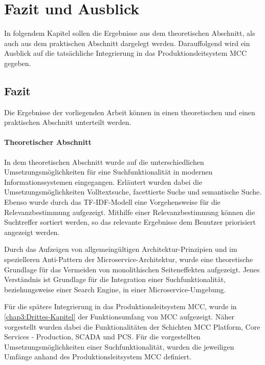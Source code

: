 \chapter{Fazit und Ausblick\label{chap6:Sechstes-Kapitel}}

In folgendem Kapitel sollen die Ergebnisse aus dem theoretischen Abschnitt, als auch aus dem praktischen Abschnitt dargelegt werden. Darauffolgend wird ein Ausblick auf die tatsächliche Integrierung in das Produktionsleitsystem MCC gegeben.

\section{Fazit\label{sec6.1:Unterpunkt-1}}

Die Ergebnisse der vorliegenden Arbeit können in einen theoretischen und einen praktischen Abschnitt unterteilt werden.

\subsubsection{Theoretischer Abschnitt}

In dem theoretischen Abschnitt wurde auf die unterschiedlichen Umsetzungsmöglichkeiten für eine Suchfunktionalität in modernen Informationssystemen eingegangen. Erläutert wurden dabei die Umsetzungsmöglichkeiten \glqq Volltextsuche\grqq{}, \glqq facettierte Suche\grqq{} und \glqq semantische Suche\grqq{}. Ebenso wurde durch das \glqq TF-IDF\grqq{}-Modell eine Vorgehensweise für die Relevanzbestimmung aufgezeigt. Mithilfe einer Relevanzbestimmung können die Suchtreffer sortiert werden, so das relevante Ergebnisse dem Benutzer priorisiert angezeigt werden.

Durch das Aufzeigen von allgemeingültigen Architektur-Prinzipien und im spezielleren Anti-Pattern der Microservice-Architektur, wurde eine theoretische Grundlage für das Vermeiden von monolithischen Seiteneffekten aufgezeigt. Jenes Verständnis ist Grundlage für die Integration einer Suchfunktionalität, beziehungsweise einer Search Engine, in einer Microservice-Umgebung.

Für die spätere Integrierung in das Produktionsleitsystem MCC, wurde in \autoref{chap3:Drittes-Kapitel} der Funktionsumfang von MCC aufgezeigt. Näher vorgestellt wurden dabei die Funktionalitäten der Schichten \glqq MCC Platform\grqq{}, \glqq Core Services - Production\grqq{}, \glqq SCADA\grqq{} und \glqq PCS\grqq{}. Für die vorgestellten Umsetzungsmöglichkeiten einer Suchfunktionalität, wurden die jeweiligen Umfänge anhand des Produktionsleitsystem MCC definiert.

